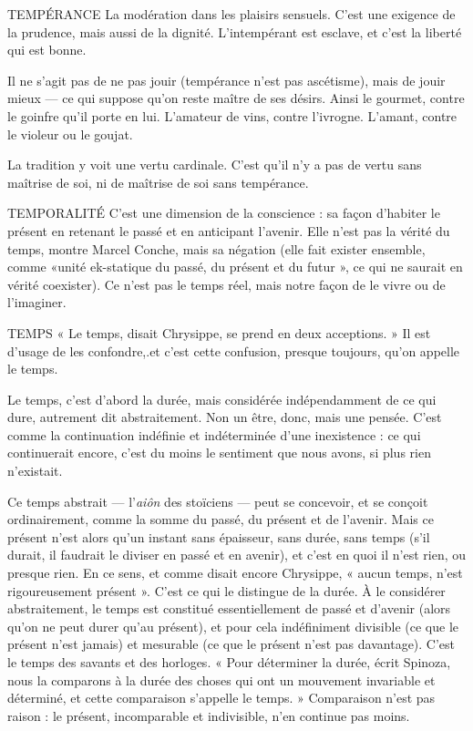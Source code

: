 TEMPÉRANCE La modération dans les plaisirs sensuels. C’est une exigence
de la prudence, mais aussi de la dignité. L’intempérant est
esclave, et c’est la liberté qui est bonne.

Il ne s’agit pas de ne pas jouir (tempérance n’est pas ascétisme), mais de
jouir mieux — ce qui suppose qu’on reste maître de ses désirs. Ainsi le gourmet,
contre le goinfre qu’il porte en lui. L’amateur de vins, contre l’ivrogne.
L'amant, contre le violeur ou le goujat.

La tradition y voit une vertu cardinale. C’est qu’il n’y a pas de vertu sans
maîtrise de soi, ni de maîtrise de soi sans tempérance.

TEMPORALITÉ C’est une dimension de la conscience : sa façon d’habiter
le présent en retenant le passé et en anticipant l'avenir.
Elle n’est pas la vérité du temps, montre Marcel Conche, mais sa négation (elle
fait exister ensemble, comme «unité ek-statique du passé, du présent et du
futur », ce qui ne saurait en vérité coexister). Ce n’est pas le temps réel, mais
notre façon de le vivre ou de l’imaginer.

TEMPS  « Le temps, disait Chrysippe, se prend en deux acceptions. » Il est
d’usage de les confondre,.et c’est cette confusion, presque toujours,
qu’on appelle le temps.

Le temps, c’est d’abord la durée, mais considérée indépendamment de ce
qui dure, autrement dit abstraitement. Non un être, donc, mais une pensée.
C’est comme la continuation indéfinie et indéterminée d’une inexistence : ce
qui continuerait encore, c’est du moins le sentiment que nous avons, si plus
rien n'existait.

Ce temps abstrait — l’{\it aiôn} des stoïciens — peut se concevoir, et se conçoit
ordinairement, comme la somme du passé, du présent et de l’avenir. Mais ce
présent n’est alors qu’un instant sans épaisseur, sans durée, sans temps (s’il
durait, il faudrait le diviser en passé et en avenir), et c’est en quoi il n’est rien,
ou presque rien. En ce sens, et comme disait encore Chrysippe, « aucun temps,
n’est rigoureusement présent ». C’est ce qui le distingue de la durée. À le considérer
abstraitement, le temps est constitué essentiellement de passé et d’avenir
(alors qu’on ne peut durer qu’au présent), et pour cela indéfiniment divisible
(ce que le présent n’est jamais) et mesurable (ce que le présent n’est pas davantage).
C’est le temps des savants et des horloges. « Pour déterminer la durée,
écrit Spinoza, nous la comparons à la durée des choses qui ont un mouvement
invariable et déterminé, et cette comparaison s’appelle le temps. » Comparaison
n’est pas raison : le présent, incomparable et indivisible, n’en continue pas
moins.

